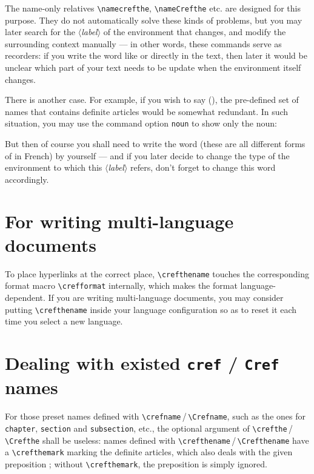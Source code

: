 \documentclass[classical]{einfart}
\newcommand{\meta}[1]{$\langle${\normalfont\itshape#1}$\rangle$}
\newcommand{\commandoption}[1]{\texttt{\textcolor{code-keys}{#1}}}
\begin{document}
The name-only relatives \lstinline|\namecrefthe|, \lstinline|\nameCrefthe| etc. are designed for this purpose. They do not automatically solve these kinds of problems, but you may later search for the \meta{label} of the environment that changes, and modify the surrounding context manually --- in other words, these commands serve as recorders: if you write the word like  or  directly in the text, then later it would be unclear which part of your text needs to be update when the environment itself changes.

There is another case. For example, if you wish to say  (), the pre-defined set of names that contains definite articles would be somewhat redundant. In such situation, you may use the command option \commandoption{noun} to show only the noun:

\begin{code}
\namecref[(*\commandoption{noun}*)]{(*\meta{label}*)}
\end{code}

But then of course you shall need to write the word  (these are all different forms of  in French) by yourself --- and if you later decide to change the type of the environment to which this \meta{label} refers, don't forget to change this word accordingly.

\section{For writing multi-language documents}

To place hyperlinks at the correct place, \lstinline|\crefthename| touches the corresponding format macro \lstinline|\crefformat| internally, which makes the format language-dependent. If you are writing multi-language documents, you may consider putting \lstinline|\crefthename| inside your language configuration so as to reset it each time you select a new language.

\section{Dealing with existed \texttt{cref} / \texttt{Cref} names}

For those preset names defined with \lstinline|\crefname|\,/\,\lstinline|\Crefname|, such as the ones for \texttt{chapter}, \texttt{section} and \texttt{subsection}, etc., the optional argument of \lstinline|\crefthe|\,/\,\lstinline|\Crefthe| shall be useless: names defined with \lstinline|\crefthename|\,/\,\lstinline|\Crefthename| have a \lstinline|\crefthemark| marking the definite articles, which also deals with the given preposition ; without \lstinline|\crefthemark|, the preposition is simply ignored.
\end{document}
